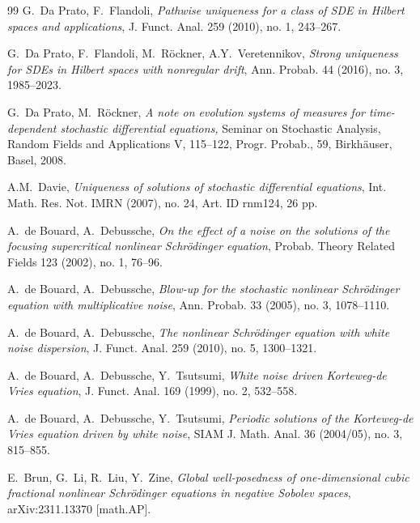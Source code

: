 \documentclass[letterpaper, 11pt,  reqno]{amsart}
\newcommand{\1}{\hspace{0.5mm}\text{I}\hspace{0.5mm}}
\numberwithin{equation}{section}
\numberwithin{theorem}{section}
\begin{document}
\begin{thebibliography}{99}
G.~Da Prato, F.~Flandoli, 
{\it Pathwise uniqueness for a class of SDE in Hilbert spaces and applications}, 
J. Funct. Anal. 259 (2010), no. 1, 243--267. 

G.~Da Prato, F.~Flandoli, M.~R\"ockner, A.Y.~Veretennikov, 
{\it Strong uniqueness for SDEs in Hilbert spaces with nonregular drift}, 
Ann. Probab. 44 (2016), no. 3, 1985--2023. 



G.~Da Prato, M.~R\"ockner, 
{\it A note on evolution systems of measures for time-dependent stochastic differential equations,}
Seminar on Stochastic Analysis, Random Fields and Applications V, 115--122,
Progr. Probab., 59, Birkh\"auser, Basel, 2008. 

%
A.M.~Davie,
{\it Uniqueness of solutions of stochastic differential equations},
Int. Math. Res. Not. IMRN (2007), no. 24, Art. ID rnm124, 26 pp.






A.~de Bouard, A.~Debussche, 
{\it On the effect of a noise on the solutions of the focusing supercritical nonlinear Schr\"odinger equation},
Probab. Theory Related Fields 123 (2002), no. 1, 76--96.



A.~de Bouard, A.~Debussche, 
{\it Blow-up for the stochastic nonlinear Schr\"odinger equation with multiplicative noise},
Ann. Probab. 33 (2005), no. 3, 1078--1110.



A.~de Bouard, A.~Debussche, 
{\it The nonlinear Schr\"odinger equation with white noise dispersion},
J. Funct. Anal. 259 (2010), no. 5, 1300--1321. 



A.~de Bouard, A.~Debussche, Y.~Tsutsumi,
{\it White noise driven Korteweg-de Vries equation}, 
J. Funct. Anal. 169 (1999), no. 2, 532--558.


A.~de Bouard, A.~Debussche, Y.~Tsutsumi,
{\it Periodic solutions of the Korteweg-de Vries equation driven by white noise},
 SIAM J. Math. Anal. 36 (2004/05), no. 3, 815--855.
 
 
 
E.~Brun, G.~Li, R.~Liu, Y.~Zine,
{\it  Global well-posedness of one-dimensional cubic fractional nonlinear Schr\"odinger equations in negative Sobolev spaces}, 
 arXiv:2311.13370 [math.AP].


\end{thebibliography}
\end{document}
